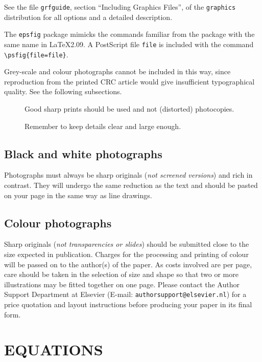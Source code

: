\documentclass[fleqn,twoside]{article}
\begin{document}
See the file \texttt{grfguide}, section ``Including Graphics Files'',
of the \texttt{graphics} distribution for all options and a detailed
description.

The \texttt{epsfig} package mimicks the commands familiar from the
package with the same name in \LaTeX2.09. A PostScript file
\texttt{file} is included with the command
\verb|\psfig{file=file}|.

Grey-scale and colour photographs cannot be included in this way,
since reproduction from the printed CRC article would give
insufficient typographical quality. See the following subsections.

\begin{figure}[htb]
\vspace{9pt}
\framebox[55mm]{\rule[-21mm]{0mm}{43mm}}
\caption{Good sharp prints should be used and not (distorted) photocopies.}
\label{fig:largenenough}
\end{figure}
%
\begin{figure}[htb]
\framebox[55mm]{\rule[-21mm]{0mm}{43mm}}
\caption{Remember to keep details clear and large enough.}
\label{fig:toosmall}
\end{figure}

\subsection{Black and white photographs}

Photographs must always be sharp originals ({\em not screened
versions\/}) and rich in contrast. They will undergo the same reduction
as the text and should be pasted on your page in the same way as line
drawings.

\subsection{Colour photographs}

Sharp originals ({\em not transparencies or slides\/}) should be
submitted close to the size expected in publication. Charges for the
processing and printing of colour will be passed on to the author(s) of
the paper. As costs involved are per page, care should be taken in the
selection of size and shape so that two or more illustrations may be
fitted together on one page. Please contact the Author Support
Department at Elsevier (E-mail: \texttt{authorsupport@elsevier.nl})
for a price quotation and layout instructions before producing your
paper in its final form.

\section{EQUATIONS}
\end{document}
